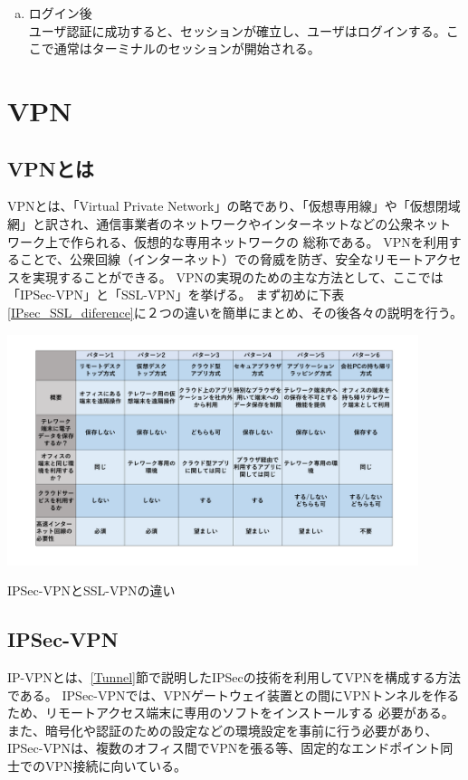 \documentclass[12pt,a4paper,titlepage]{jreport}
\begin{document}
\begin{enumerate}[(a)]
\begin{enumerate}[(1)]
    \end{enumerate}
    \item ログイン後\mbox{}\\
    ユーザ認証に成功すると、セッションが確立し、ユーザはログインする。ここで通常はターミナルのセッションが開始される。
    
\end{enumerate}






\section{VPN}\label{aboutVPN}

\subsection*{VPNとは}
VPNとは、「Virtual Private Network」の略であり、「仮想専用線」や「仮想閉域網」と訳され、通信事業者のネットワークやインターネットなどの公衆ネットワーク上で作られる、仮想的な専用ネットワークの
総称である。
VPNを利用することで、公衆回線（インターネット）での脅威を防ぎ、安全なリモートアクセスを実現することができる。
VPNの実現のための主な方法として、ここでは「IPSec-VPN」と「SSL-VPN」を挙げる。
まず初めに下表\ref{IPsec_SSL_diference}に２つの違いを簡単にまとめ、その後各々の説明を行う。
\begin{table}[h]
    \centering
    \includegraphics[width=0.9\textwidth, page=2]{graphs/telework_list.pdf}
    \caption{IPSec-VPNとSSL-VPNの違い}
    \label{IPsec_SSL_diference}
\end{table}

\subsection{IPSec-VPN}
IP-VPNとは、\ref{Tunnel}節で説明したIPSecの技術を利用してVPNを構成する方法である。
IPSec-VPNでは、VPNゲートウェイ装置との間にVPNトンネルを作るため、リモートアクセス端末に専用のソフトをインストールする
必要がある。また、暗号化や認証のための設定などの環境設定を事前に行う必要があり、
IPSec-VPNは、複数のオフィス間でVPNを張る等、固定的なエンドポイント同士でのVPN接続に向いている。
\end{document}
